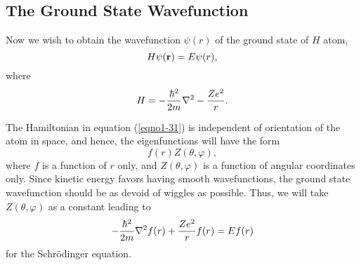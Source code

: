 \subsection{The Ground State Wavefunction}

Now we wish to obtain the wavefunction $\psi (r)$ of the ground state of $H$
atom,
\begin{equation}
H \psi ( {\bf r} ) = E \psi ( r ),
\label{eqno1-30}
\end{equation}
where
\begin{equation}
H = - {\hbar^2 \over 2m} \nabla^2 - {Ze^2 \over r}.
\label{eqno1-31}
\end{equation}

The Hamiltonian in equation (\ref{eqno1-31}) is independent of
orientation of the atom in space, and hence, the eigenfunctions will
have the form
\begin{equation}
f (r) Z (\theta, \varphi),
\label{eqno1-32}
\end{equation}
where $f$ is a function of $r$ only, and $Z(\theta,\varphi)$ is a function 
of angular coordinates only. Since kinetic energy favors having smooth 
wavefunctions, the ground state wavefunction should be
as devoid of wiggles as possible. Thus, we will take $Z(\theta,\varphi)$ 
as a constant leading to
\begin{equation}
-{\hbar^2 \over 2m} \nabla^2 f ( r ) + {Ze^2 \over r} f ( r ) = E f ( r 
)
\label{eqno1-33}
\end{equation}
for the Schr\"odinger equation.

